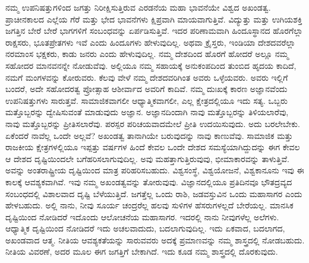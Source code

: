 ನಮ್ಮ ಉಪನಿಷತ್ತುಗಳಿಂದ ಜಗತ್ತು ನಿರೀಕ್ಷಿಸುತ್ತಿರುವ ಎರಡನೆಯ ಮಹಾ ಭಾವನೆಯೇ ವಿಶ್ವದ ಅಖಂಡತ್ವ. ಪ್ರಾಚೀನಕಾಲದ ಎಲ್ಲೆಯ ಗೆರೆ ಮತ್ತು ಭೇದ ಭಾವನೆಗಳು ಕ್ಷಿಪ್ರವಾಗಿ ಮಾಯವಾಗುತ್ತಿವೆ. ವಿದ್ಯುತ್ತು ಮತ್ತು ಉಗಿಯಶಕ್ತಿ ಜಗತ್ತಿನ ಬೇರೆ ಬೇರೆ ಭಾಗಗಳಿಗೆ ಸಂಬಂಧವನ್ನು ಏರ್ಪಡಿಸುತ್ತಿವೆ. ಇದರ ಪರಿಣಾಮವಾಗಿ ಹಿಂದೂಸ್ಥಾನದ ಹೊರಗೆಲ್ಲಾ ರಾಕ್ಷಸರು, ಭೂತಪ್ರೇತಗಳು ಇವೆ ಎಂದು ಹಿಂದೂಗಳು ಹೇಳುವುದಿಲ್ಲ. ಅಥವಾ ಕ್ರೈಸ್ತರು, ಇಂಡಿಯಾ ದೇಶದವರೆಲ್ಲಾ ನರಮಾಂಸ ಭಕ್ಷಕರು, ಕಾಡು ಜನರು ಎಂದು ಹೇಳುವುದಿಲ್ಲ. ನಮ್ಮ ದೇಶದಿಂದ ಹೊರಗೆ ಹೋದರೆ ಅಲ್ಲೂ ನಮ್ಮ ಸಹೋದರ ಮಾನವನನ್ನೇ ನೋಡುವೆವು. ಅಲ್ಲಿಯೂ ನಮ್ಮ ಸಹಾಯಕ್ಕೆ ಅನುಕಂಪದಿಂದ ತುಂಬಿದ ಹೃದಯ ಕಾದಿದೆ, ನಮಗೆ ಮಂಗಳವನ್ನು ಕೋರುವರು. ಕೆಲವು ವೇಳೆ ನಮ್ಮ ದೇಶದವರಿಗಿಂತ ಅವರು ಒಳ್ಳೆಯವರು. ಅವರು ಇಲ್ಲಿಗೆ ಬಂದರೆ, ಅದೇ ಸಹೋದರತ್ವ ಪ್ರೋತ್ಸಾಹ ಆಶೀರ್ವಾದ ಅವರಿಗೆ ಕಾದಿವೆ. ನಮ್ಮ ದುಃಖಕ್ಕೆ ಕಾರಣ ಅಜ್ಞಾನವೆಂದು ಉಪನಿಷತ್ತುಗಳು ಸಾರುತ್ತವೆ. ಸಾಮಾಜಿಕವಾಗಲೀ ಆಧ್ಯಾತ್ಮಿಕವಾಗಲೀ, ಎಲ್ಲ ಕ್ಷೇತ್ರದಲ್ಲಿಯೂ ಇದು ಸತ್ಯ. ಒಬ್ಬರು ಮತ್ತೊಬ್ಬರನ್ನು ದ್ವೇಷಿಸುವಂತೆ ಮಾಡುವುದು ಅಜ್ಞಾನ. ಅಜ್ಞಾನದಿಂದಾಗಿ ನಾವು ಮತ್ತೊಬ್ಬರನ್ನು ತಿಳಿಯಲಾರೆವು, ನಾವು ಮತ್ತೊಬ್ಬರನ್ನು ಪ್ರೀತಿಸಲಾರೆವು. ಪರಸ್ಪರ ಪರಿಚಯವಾದಮೇಲೆ ಪ್ರೀತಿ ಉದಯಿಸುವುದು. ಅದು ಬರಲೇಬೇಕು. ಏಕೆಂದರೆ ನಾವೆಲ್ಲ ಒಂದೇ ಅಲ್ಲವೆ? ಅಖಂಡತ್ವ ತಾನಾಗಿಯೇ ಬರುವುದನ್ನು ನಾವು ಕಾಣುವೆವು. ಸಾಮಾಜಿಕ ಮತ್ತು ರಾಜಕೀಯ ಕ್ಷೇತ್ರಗಳಲ್ಲಿಯೂ ಇಪ್ಪತ್ತು ವರ್ಷಗಳ ಹಿಂದೆ ಕೇವಲ ಒಂದೇ ದೇಶದ ಸಮಸ್ಯೆಯಾಗಿದ್ದುದನ್ನು ಈಗ ಕೇವಲ ಆ ದೇಶದ ದೃಷ್ಟಿಯಿಂದಲೇ ಬಗೆಹರಿಸಲಾಗುವುದಿಲ್ಲ. ಅವು ಮಹತ್ತಾಗುತ್ತಿರುವುವು, ಭೀಮಾಕಾರವನ್ನು ತಾಳುತ್ತಿವೆ. ಅವನ್ನು ಅಂತರಾಷ್ಟ್ರೀಯ ದೃಷ್ಟಿಯಿಂದ ಮಾತ್ರ ಪರಿಹರಿಸಬಹುದು. ವಿಶ್ವಸಂಸ್ಥೆ, ವಿಶ್ವಯೋಜನೆ, ವಿಶ್ವಕಾನೂನು ಇವು ಈ ಕಾಲಕ್ಕೆ ಆವಶ್ಯಕವಾಗಿವೆ. ಇವು ನಮ್ಮ ಅಖಂಡತ್ವವನ್ನು ತೋರುವುವು. ವಿಜ್ಞಾನದಲ್ಲಿಯೂ ಪ್ರತಿದಿನವೂ ಭೌತದ್ರವ್ಯದ ಸಂಬಂಧದಲ್ಲಿ ವಿಶಾಲವಾದ ದೃಷ್ಟಿ ಬೆಳೆಯುತ್ತಿದೆ. ಜಗತ್ತೆಲ್ಲ ಒಂದು ರಾಶಿ, ಜಡವಸ್ತುವಿನ ಒಂದು ಮಹಾಸಾಗರ  ಎಂದು ಹೇಳಬಹುದು. ಅಲ್ಲಿ ನಾನು, ನೀವು ಸೂರ್ಯ ಚಂದ್ರರೆಲ್ಲ ಹಲವು ಸುಳಿಗಳ ಹೆಸರುಗಳಲ್ಲದೆ ಬೇರೆಯಲ್ಲ. ಮಾನಸಿಕ ದೃಷ್ಟಿಯಿಂದ ನೋಡಿದರೆ ಇದೊಂದು ಆಲೋಚನೆಯ ಮಹಾಸಾಗರ. ಇದರಲ್ಲಿ ನಾನು ನೀವುಗಳೆಲ್ಲ ಅಲೆಗಳು. ಆಧ್ಯಾತ್ಮಿಕ ದೃಷ್ಟಿಯಿಂದ ನೋಡಿದರೆ ಇದು ಅಚಲವಾದುದು, ಬದಲಾಗುವುದಿಲ್ಲ. ಇದು ಏಕವಾದ, ಬದಲಾಗದ, ಅಖಂಡವಾದ ಆತ್ಮ. ನೀತಿಯ ಆವಶ್ಯಕತೆಯನ್ನು ಸಾರುವವರು ಅದಕ್ಕೆ ಪ್ರಮಾಣವನ್ನು ನಮ್ಮ ಶಾಸ್ತ್ರದಲ್ಲಿ ನೋಡಬಹುದು. ನೀತಿಯ ವಿವರಣೆ, ಅದರ ಮೂಲ ಈಗ ಜಗತ್ತಿಗೆ ಬೇಕಾಗಿದೆ. ಇದು ಕೂಡ ನಮ್ಮ ಶಾಸ್ತ್ರದಲ್ಲಿ ದೊರಕುವುದು.

\vskip   4pt

